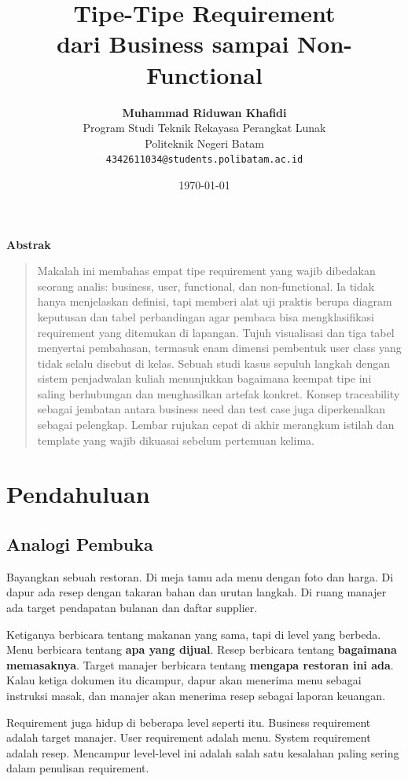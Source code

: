 \documentclass[11pt,a4paper]{article}
\title{\vspace{-1.5cm}\textbf{\sffamily\LARGE Tipe-Tipe Requirement\\ dari Business sampai Non-Functional}}
\author{
	\textbf{Muhammad Riduwan Khafidi} \\
	\small Program Studi Teknik Rekayasa Perangkat Lunak \\
	\small Politeknik Negeri Batam \\
	\small \texttt{4342611034@students.polibatam.ac.id}
}
\date{\small\today}
\renewenvironment{abstract}
{\small
	\begin{center}\textbf{\sffamily Abstrak}\end{center}
	\begin{quote}}
	{\end{quote}}
\begin{document}
\maketitle
\thispagestyle{empty}

\begin{abstract}
	Makalah ini membahas empat tipe requirement yang wajib dibedakan seorang analis: business, user, functional, dan non-functional. Ia tidak hanya menjelaskan definisi, tapi memberi alat uji praktis berupa diagram keputusan dan tabel perbandingan agar pembaca bisa mengklasifikasi requirement yang ditemukan di lapangan. Tujuh visualisasi dan tiga tabel menyertai pembahasan, termasuk enam dimensi pembentuk user class yang tidak selalu disebut di kelas. Sebuah studi kasus sepuluh langkah dengan sistem penjadwalan kuliah menunjukkan bagaimana keempat tipe ini saling berhubungan dan menghasilkan artefak konkret. Konsep traceability sebagai jembatan antara business need dan test case juga diperkenalkan sebagai pelengkap. Lembar rujukan cepat di akhir merangkum istilah dan template yang wajib dikuasai sebelum pertemuan kelima.
\end{abstract}

\section{Pendahuluan}

\subsection{Analogi Pembuka}

Bayangkan sebuah restoran. Di meja tamu ada menu dengan foto dan harga. Di dapur ada resep dengan takaran bahan dan urutan langkah. Di ruang manajer ada target pendapatan bulanan dan daftar supplier.

Ketiganya berbicara tentang makanan yang sama, tapi di level yang berbeda. Menu berbicara tentang \textbf{apa yang dijual}. Resep berbicara tentang \textbf{bagaimana memasaknya}. Target manajer berbicara tentang \textbf{mengapa restoran ini ada}. Kalau ketiga dokumen itu dicampur, dapur akan menerima menu sebagai instruksi masak, dan manajer akan menerima resep sebagai laporan keuangan.

Requirement juga hidup di beberapa level seperti itu. Business requirement adalah target manajer. User requirement adalah menu. System requirement adalah resep. Mencampur level-level ini adalah salah satu kesalahan paling sering dalam penulisan requirement.
\end{document}
